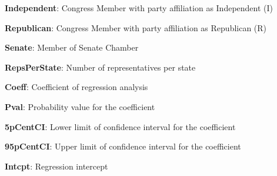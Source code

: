 \documentclass[11pt]{article}
\begin{document}
\begin{codeoutput}
\begin{table}[h]
\caption{Regression analysis of interactions count by Party, Chamber, and the number of representatives per State}
\label{table:regress_interactions}
\begin{threeparttable}
\renewcommand{\TPTminimum}{\linewidth}
\begin{tablenotes}
\footnotesize
\item \textbf{Independent}: Congress Member with party affiliation as Independent (I)
\item \textbf{Republican}: Congress Member with party affiliation as Republican (R)
\item \textbf{Senate}: Member of Senate Chamber
\item \textbf{RepsPerState}: Number of representatives per state
\item \textbf{Coeff}: Coefficient of regression analysis
\item \textbf{Pval}: Probability value for the coefficient
\item \textbf{5pCentCI}: Lower limit of confidence interval for the coefficient
\item \textbf{95pCentCI}: Upper limit of confidence interval for the coefficient
\item \textbf{Intcpt}: Regression intercept
\end{tablenotes}
\end{threeparttable}
\end{table}

\end{codeoutput}
\end{document}
